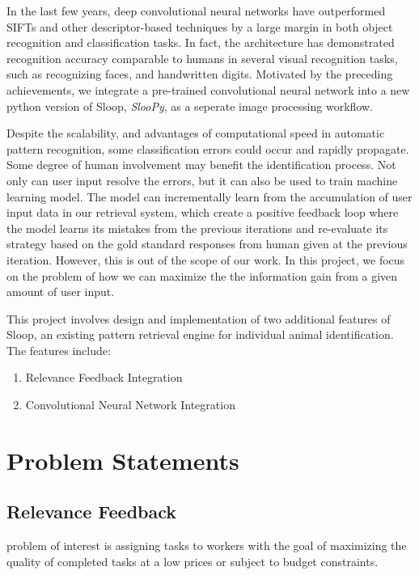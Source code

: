 In the last few years, deep convolutional neural networks\cite{lecun95, kriz12}
have outperformed SIFTs and other descriptor-based techniques by a large margin
in both object recognition and classification tasks\cite{kriz12, fisher14,
ILSVRC15}. In fact, the architecture has demonstrated recognition accuracy
comparable to humans in several visual recognition tasks, such as recognizing
faces\cite{deepface14}, and handwritten digits\cite{mnist13}. Motivated by the
preceding achievements, we integrate a pre-trained convolutional neural network
into a new python version of Sloop, \emph{SlooPy}, as a seperate image
processing workflow.

Despite the scalability, and advantages of computational speed in automatic
pattern recognition, some classification errors could occur and rapidly
propagate. Some degree of human involvement may benefit the identification
process. Not only can user input resolve the errors, but it can also be used to
train machine learning model. The model can incrementally learn from the
accumulation of user input data in our retrieval system, which create a
positive feedback loop where the model learns its mistakes from the previous
iterations and re-evaluate its strategy based on the gold standard responses
from human given at the previous iteration. However, this is out of the scope
of our work. In this project, we focus on the problem of how we can maximize
the the information gain from a given amount of user input.

This project involves design and implementation of two additional features of
Sloop, an existing pattern retrieval engine for individual animal
identification. The features include: \begin{enumerate} \item Relevance
Feedback Integration \item Convolutional Neural Network Integration
\end{enumerate}

\section{Problem Statements}

\subsection{Relevance Feedback} %
problem of interest is assigning tasks to workers with the goal of maximizing
the quality of completed tasks at a low prices or subject to budget
constraints.

